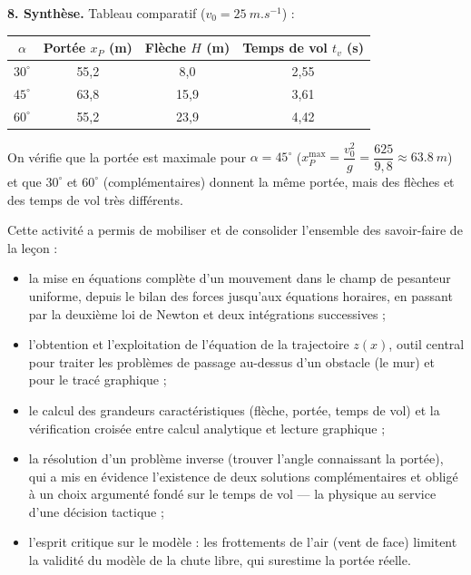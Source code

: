 \documentclass[11pt]{article}
\newcommand{\cle}[1]{{\popxbold\color{popdark}#1}}
\newcounter{popsec}
\newcounter{popsub}
\newcommand{\courssub}[1]{%
  \stepcounter{popsub}%
  \par\vspace{9pt}\noindent{\popxbold\fontsize{11.5}{13}\selectfont\color{popink}{\color{poporange}\thepopsec.\thepopsub}\hspace{6pt}#1}\par\nopagebreak\vspace{4pt}
}
\begin{document}
\begin{exoresolu}
\textbf{8. Synthèse.} Tableau comparatif ($v_0 = \SI{25}{m.s^{-1}}$) :

\begin{center}
\begin{tabular}{|c|c|c|c|}\hline
\rowcolor{popblueL}
$\alpha$ & Portée $x_P$ (m) & Flèche $H$ (m) & Temps de vol $t_v$ (s) \\ \hline
$30^{\circ}$ & 55,2 & 8,0 & 2,55 \\ \hline
$45^{\circ}$ & 63,8 & 15,9 & 3,61 \\ \hline
$60^{\circ}$ & 55,2 & 23,9 & 4,42 \\ \hline
\end{tabular}
\end{center}

On vérifie que la portée est maximale pour $\alpha = 45^{\circ}$ ($x_P^{\max} = \dfrac{v_0^2}{g} = \dfrac{625}{9{,}8} \approx \SI{63,8}{m}$) et que $30^{\circ}$ et $60^{\circ}$ (complémentaires) donnent la même portée, mais des flèches et des temps de vol très différents.
\end{exoresolu}

\courssub{Bilan de l'activité}

Cette activité a permis de mobiliser et de consolider l'ensemble des savoir-faire de la leçon :

\begin{itemize}
\item la \cle{mise en équations} complète d'un mouvement dans le champ de pesanteur uniforme, depuis le bilan des forces jusqu'aux équations horaires, en passant par la deuxième loi de Newton et deux intégrations successives ;
\item l'obtention et l'exploitation de l'\cle{équation de la trajectoire} $z(x)$, outil central pour traiter les problèmes de passage au-dessus d'un obstacle (le mur) et pour le tracé graphique ;
\item le calcul des grandeurs caractéristiques (\cle{flèche}, \cle{portée}, \cle{temps de vol}) et la vérification croisée entre calcul analytique et lecture graphique ;
\item la résolution d'un \cle{problème inverse} (trouver l'angle connaissant la portée), qui a mis en évidence l'existence de deux solutions complémentaires et obligé à un choix argumenté fondé sur le temps de vol — la physique au service d'une décision tactique ;
\item l'esprit critique sur le modèle : les frottements de l'air (vent de face) limitent la validité du modèle de la chute libre, qui surestime la portée réelle.
\end{itemize}
\end{document}
